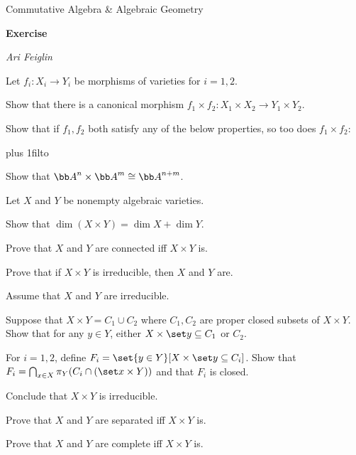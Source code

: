 


\def\enumindent{0cm}

\def\printmcount{\the\counter{section}.\the\counter{math counter}}
\setcounter{section}{11}

\centerline{Commutative Algebra \& Algebraic Geometry}
\medskip
\centerline{\bf Exercise \the{}}
\smallskip
\centerline{\it Ari Feiglin}

\bprob

    \benum
        \item Let $f_i\colon X_i\to Y_i$ be morphisms of varieties for $i=1,2$.
        \benum
            \item Show that there is a canonical morphism $f_1\times f_2\colon X_1\times X_2\to Y_1\times Y_2$.
            \item Show that if $f_1,f_2$ both satisfy any of the below properties, so too does $f_1\times f_2$:

            {\tabskip=0pt plus 1fil\halign to}
        \eenum
        \item Show that $\bA^n\times\bA^m\cong\bA^{n+m}$.
        \item Let $X$ and $Y$ be nonempty algebraic varieties.
        \benum
            \item Show that $\dim(X\times Y)=\dim X+\dim Y$.
            \item Prove that $X$ and $Y$ are connected iff $X\times Y$ is.
            \item Prove that if $X\times Y$ is irreducible, then $X$ and $Y$ are.
            \item Assume that $X$ and $Y$ are irreducible.
            \benum
                \item Suppose that $X\times Y=C_1\cup C_2$ where $C_1,C_2$ are proper closed subsets of $X\times Y$.
                Show that for any $y\in Y$, either $X\times\set y\subseteq C_1$ or $C_2$.
                \item For $i=1,2$, define $F_i=\set{y\in Y}[X\times\set y\subseteq C_i]$.
                Show that $F_i=\bigcap_{x\in X}\pi_Y(C_i\cap(\set x\times Y))$ and that $F_i$ is closed.
                \item Conclude that $X\times Y$ is irreducible.
            \eenum
            \item Prove that $X$ and $Y$ are separated iff $X\times Y$ is.
            \item Prove that $X$ and $Y$ are complete iff $X\times Y$ is.
        \eenum
    \eenum

